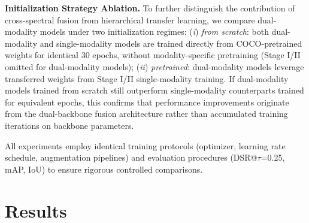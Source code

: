 \documentclass[journal,twoside,web]{ieeecolor}
\begin{document}
\textbf{Initialization Strategy Ablation.} To further distinguish the contribution of cross-spectral fusion from hierarchical transfer learning, we compare dual-modality models under two initialization regimes: (\textit{i}) \textit{from scratch}: both dual-modality and single-modality models are trained directly from COCO-pretrained weights for identical 30 epochs, without modality-specific pretraining (Stage I/II omitted for dual-modality models); (\textit{ii}) \textit{pretrained}: dual-modality models leverage transferred weights from Stage I/II single-modality training. If dual-modality models trained from scratch still outperform single-modality counterparts trained for equivalent epochs, this confirms that performance improvements originate from the dual-backbone fusion architecture rather than accumulated training iterations on backbone parameters.

All experiments employ identical training protocols (optimizer, learning rate schedule, augmentation pipelines) and evaluation procedures (DSR@$\tau$=0.25, mAP, IoU) to ensure rigorous controlled comparisons.



\section{Results}
\label{sec:results}
\end{document}
